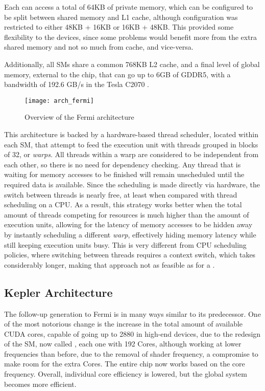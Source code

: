 \documentclass[main.tex]{subfiles}
\begin{document}
Each \sm can access a total of 64KB of private memory, which can be configured to be split between shared memory and L1 cache, although configuration was restricted to either 48KB + 16KB or 16KB + 48KB. This provided some flexibility to the devices, since some problems would benefit more from the extra shared memory and not so much from cache, and vice-versa.

Additionally, all \acsp{SM} share a common 768KB L2 cache, and a final level of global memory, external to the chip, that can go up to 6GB of GDDR5, with a bandwidth of 192.6 GB/s in the Tesla C2070 \cite{NVIDIA:fermi}.

\begin{figure}[!htp]
  \centering
  \texttt{[image: arch\_fermi]}
  \caption{Overview of the Fermi architecture \label{fig:fermi}}
\end{figure}

This architecture is backed by a hardware-based thread scheduler, located within each \acs{SM}, that attempt to feed the execution unit with threads grouped in blocks of 32, or \textit{warps}. All threads within a warp are considered to be independent from each other, so there is no need for dependency checking. Any thread that is waiting for memory accesses to be finished will remain unscheduled until the required data is available. Since the scheduling is made directly via hardware, the switch between threads is nearly free, at least when compared with thread scheduling on a \acs{CPU}. As a result, this strategy works better when the total amount of threads competing for resources is much higher than the amount of execution units, allowing for the latency of memory accesses to be hidden away by instantly scheduling a different \textit{warp}, effectively hiding memory latency while still keeping execution units busy. This is very different from \acs{CPU} scheduling policies, where switching between threads requires a context switch, which takes considerably longer, making that approach not as feasible as for a \gpus.



\subsection{Kepler Architecture}

The follow-up generation to Fermi is in many ways similar to its predecessor. One of the most notorious change is the increase in the total amount of available CUDA cores, capable of going up to 2880 in high-end devices, due to the redesign of the \acl{SM}, now called \smx, each one with 192 \cuda Cores, although working at lower frequencies than before, due to the removal of shader frequency, a compromise to make room for the extra \cuda Cores. The entire chip now works based on the core frequency. Overall, individual core efficiency is lowered, but the global system becomes more efficient.
\end{document}
